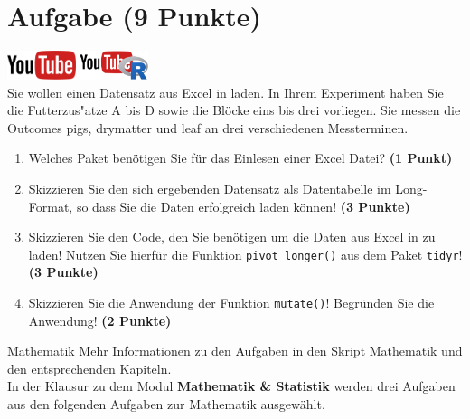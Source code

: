 \documentclass[a4paper, 10pt]{scrartcl}\usepackage[]{graphicx}\usepackage[]{xcolor}
\begin{document}
 
\clearpage

\section{Aufgabe \hfill (9 Punkte)}

\hfill\href{https://youtu.be/Oxa97uqNyCQ}{\includegraphics[width =
  2cm]{img/youtube}}
\hspace{2Ex}
\href{https://youtu.be/ymFfBkWyb8s}{\includegraphics[width =
  2cm]{img/youtube_R}}\\[1Ex]




Sie wollen einen Datensatz aus Excel in \Rlogo laden. In Ihrem Experiment haben Sie
die Futterzus{"a}tze A bis D sowie die Bl{\"o}cke eins bis drei
vorliegen. Sie messen die Outcomes pigs, drymatter und leaf an drei verschiedenen Messterminen.

\begin{enumerate}
\item Welches \Rlogo Paket ben{\"o}tigen Sie f{\"u}r das Einlesen einer Excel Datei?
  \textbf{(1 Punkt)} 
\item Skizzieren Sie den sich ergebenden Datensatz als Datentabelle im
  Long-Format, so dass Sie die Daten erfolgreich \Rlogo laden k{\"o}nnen!
  \textbf{(3 Punkte)}
\item Skizzieren Sie den \Rlogo Code, den Sie ben{\"o}tigen um die Daten aus
  Excel in \Rlogo zu laden! Nutzen Sie hierf{\"u}r die Funktion
  \texttt{pivot\_longer()} aus dem \Rlogo Paket \texttt{tidyr}! \textbf{(3
    Punkte)}
\item Skizzieren Sie die Anwendung der Funktion \texttt{mutate()}!
  Begr{\"u}nden Sie die Anwendung! \textbf{(2 Punkte)}
\end{enumerate}


 
\clearpage
\begin{graybox}{Mathematik}
Mehr Informationen zu den Aufgaben in den \href{https://jkruppa.github.io/math/}{Skript Mathematik} und den entsprechenden Kapiteln.\\

In der Klausur zu dem Modul \textbf{Mathematik \& Statistik} werden drei Aufgaben aus den folgenden Aufgaben zur Mathematik ausgew{\"a}hlt. \\
\end{graybox}
\clearpage
\end{document}
